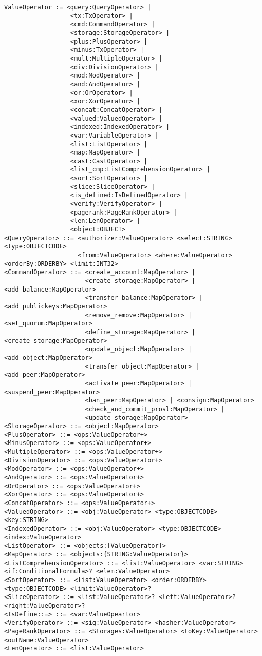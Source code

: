 \begin{verbatim}
ValueOperator := <query:QueryOperator> |
                  <tx:TxOperator> |
                  <cmd:CommandOperator> |
                  <storage:StorageOperator> |
                  <plus:PlusOperator> |
                  <minus:TxOperator> |
                  <mult:MultipleOperator> |
                  <div:DivisionOperator> |
                  <mod:ModOperator> |
                  <and:AndOperator> |
                  <or:OrOperator> |
                  <xor:XorOperator> |
                  <concat:ConcatOperator> |
                  <valued:ValuedOperator> |
                  <indexed:IndexedOperator> |
                  <var:VariableOperator> |
                  <list:ListOperator> |
                  <map:MapOperator> |
                  <cast:CastOperator> |
                  <list_cmp:ListComprehensionOperator> |
                  <sort:SortOperator> |
                  <slice:SliceOperator> |
                  <is_defined:IsDefinedOperator> |
                  <verify:VerifyOperator> |
                  <pagerank:PageRankOperator> |
                  <len:LenOperator> |
                  <object:OBJECT>
<QueryOperator> ::= <authorizer:ValueOperator> <select:STRING> <type:OBJECTCODE>
                    <from:ValueOperator> <where:ValueOperator> <orderBy:ORDERBY> <limit:INT32>
<CommandOperator> ::= <create_account:MapOperator> |
                      <create_storage:MapOperator> | <add_balance:MapOperator>
                      <transfer_balance:MapOperator> | <add_publickeys:MapOperator>
                      <remove_remove:MapOperator> | <set_quorum:MapOperator>
                      <define_storage:MapOperator> | <create_storage:MapOperator>
                      <update_object:MapOperator> | <add_object:MapOperator>
                      <transfer_object:MapOperator> | <add_peer:MapOperator>
                      <activate_peer:MapOperator> | <suspend_peer:MapOperator>
                      <ban_peer:MapOperator> | <consign:MapOperator>
                      <check_and_commit_prosl:MapOperator> |
                      <update_storage:MapOperator>
<StorageOperator> ::= <object:MapOperator>
<PlusOperator> ::= <ops:ValueOperator+>
<MinusOperator> ::= <ops:ValueOperator+>
<MultipleOperator> ::= <ops:ValueOperator+>
<DivisionOperator> ::= <ops:ValueOperator+>
<ModOperator> ::= <ops:ValueOperator+>
<AndOperator> ::= <ops:ValueOperator+>
<OrOperator> ::= <ops:ValueOperator+>
<XorOperator> ::= <ops:ValueOperator+>
<ConcatOperator> ::= <ops:ValueOperator+>
<ValuedOperator> ::= <obj:ValueOperator> <type:OBJECTCODE> <key:STRING>
<IndexedOperator> ::= <obj:ValueOperator> <type:OBJECTCODE> <index:ValueOperator>
<ListOperator> ::= <objects:[ValueOperator]>
<MapOperator> ::= <objects:{STRING:ValueOperator}>
<ListComprehensionOperator> ::= <list:ValueOperator> <var:STRING> <if:ConditionalFormula>? <elem:ValueOperator>
<SortOperator> ::= <list:ValueOperator> <order:ORDERBY> <type:OBJECTCODE> <limit:ValueOperator>?
<SliceOperator> ::= <list:ValueOperator>? <left:ValueOperator>? <right:ValueOperator>?
<IsDefine::=> ::= <var:ValueOpeartor>
<VerifyOperator> ::= <sig:ValueOperator> <hasher:ValueOperator>
<PageRankOperator> ::= <Storages:ValueOperator> <toKey:ValueOperator> <outName:ValueOperator>
<LenOperator> ::= <list:ValueOperator>


\end{verbatim}
